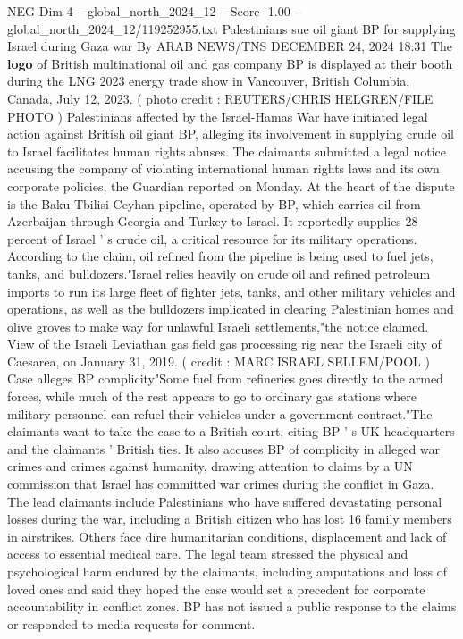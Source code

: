 \begin{textsample}{NEG Dim 4 – global\_north\_2024\_12 – Score -1.00 – global\_north\_2024\_12/119252955.txt}  \label{ex:f4_neg_151}
Palestinians sue oil giant BP for supplying Israel during Gaza war By ARAB NEWS/TNS DECEMBER 24, 2024 18:31 The \textbf{logo} of British multinational oil and gas company BP is displayed at their booth during the LNG 2023 energy trade show in Vancouver, British Columbia, Canada, July 12, 2023. ( photo credit : REUTERS/CHRIS HELGREN/FILE PHOTO ) Palestinians affected by the Israel-Hamas War have initiated legal action against British oil giant BP, alleging its involvement in supplying crude oil to Israel facilitates human rights abuses.
The claimants submitted a legal notice accusing the company of violating international human rights laws and its own corporate policies, the Guardian reported on Monday.
At the heart of the dispute is the Baku-Tbilisi-Ceyhan pipeline, operated by BP, which carries oil from Azerbaijan through Georgia and Turkey to Israel.
It reportedly supplies 28 percent of Israel ' s crude oil, a critical resource for its military operations.
According to the claim, oil refined from the pipeline is being used to fuel jets, tanks, and bulldozers."Israel relies heavily on crude oil and refined petroleum imports to run its large fleet of fighter jets, tanks, and other military vehicles and operations, as well as the bulldozers implicated in clearing Palestinian homes and olive groves to make way for unlawful Israeli settlements,"the notice claimed.
View of the Israeli Leviathan gas field gas processing rig near the Israeli city of Caesarea, on January 31, 2019. ( credit : MARC ISRAEL SELLEM/POOL ) Case alleges BP complicity"Some fuel from refineries goes directly to the armed forces, while much of the rest appears to go to ordinary gas stations where military personnel can refuel their vehicles under a government contract."The claimants want to take the case to a British court, citing BP ' s UK headquarters and the claimants ' British ties.
It also accuses BP of complicity in alleged war crimes and crimes against humanity, drawing attention to claims by a UN commission that Israel has committed war crimes during the conflict in Gaza.
The lead claimants include Palestinians who have suffered devastating personal losses during the war, including a British citizen who has lost 16 family members in airstrikes.
Others face dire humanitarian conditions, displacement and lack of access to essential medical care.
The legal team stressed the physical and psychological harm endured by the claimants, including amputations and loss of loved ones and said they hoped the case would set a precedent for corporate accountability in conflict zones.
BP has not issued a public response to the claims or responded to media requests for comment.

\end{textsample}
